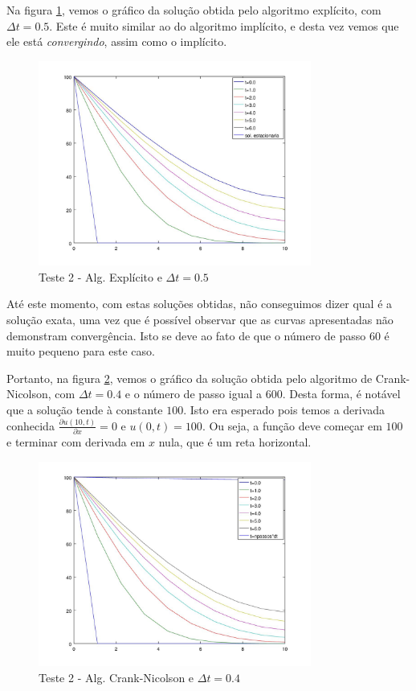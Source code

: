 \documentclass[
	11pt,				%
	oneside,			%
	a4paper,			%
	english,			%
	brazil,				%
	]{article}
\begin{document}
Na figura \ref{fig:t2-exp}, vemos o gráfico da solução obtida pelo 
algoritmo explícito, com $\Delta t = 0.5$. Este é muito similar ao do algoritmo 
implícito, e desta vez vemos que ele está \textit{convergindo}, assim como o 
implícito.

\begin{figure}[ht]
    \centering
    \includegraphics[width=0.8\textwidth]{teste2-exp-dt-05}
    \caption{Teste 2 - Alg. Explícito e $\Delta t = 0.5$}
    \label{fig:t2-exp}
\end{figure}

Até este momento, com estas soluções obtidas, não conseguimos dizer qual é a 
solução exata, uma vez que é possível observar que as curvas apresentadas não 
demonstram convergência. Isto se deve ao fato de que o número de passo $60$ é 
muito pequeno para este caso.

Portanto, na figura \ref{fig:t2-crank}, vemos o gráfico da solução obtida pelo 
algoritmo de Crank-Nicolson, com $\Delta t = 0.4$ e o número de passo igual a 
600. Desta forma, é notável que a solução tende à constante $100$. Isto era 
esperado pois temos a derivada conhecida $\frac{\partial u(10,t)}{\partial x} = 
0$ e $u(0,t) = 100$. Ou seja, a função deve começar em $100$ e terminar com 
derivada em $x$ nula, que é um reta horizontal.

\begin{figure}[ht]
    \centering
    \includegraphics[width=0.8\textwidth]{teste2-crank-dt-04}
    \caption{Teste 2 - Alg. Crank-Nicolson e $\Delta t = 0.4$}
    \label{fig:t2-crank}
\end{figure}
\end{document}
